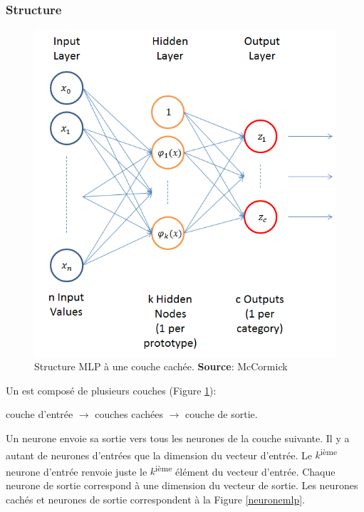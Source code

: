 \subsubsection{Structure}
\begin{figure}
 \centering
 \includegraphics[scale=0.5]{../figures/nnstruct.png}
 \caption{Structure MLP à une couche cachée. \textbf{Source}: McCormick\cite{RBFtuto}}
 \label{structuremlp}
\end{figure}
Un \mlp est composé de plusieurs couches (Figure \ref{structuremlp}):
\begin{center}
 couche d'entrée $\rightarrow$ couches cachées $\rightarrow$ couche de sortie.
\end{center}
Un neurone envoie sa sortie vers tous les neurones de la couche suivante.
Il y a autant de neurones d'entrées que la dimension du vecteur d'entrée.
Le $k$\textsuperscript{ième} neurone d'entrée renvoie juste le $k$\textsuperscript{ième} élément du vecteur d'entrée.
Chaque neurone de sortie correspond à une dimension du vecteur de sortie.
Les neurones cachés et neurones de sortie correspondent à la Figure \ref{neuronemlp}.
